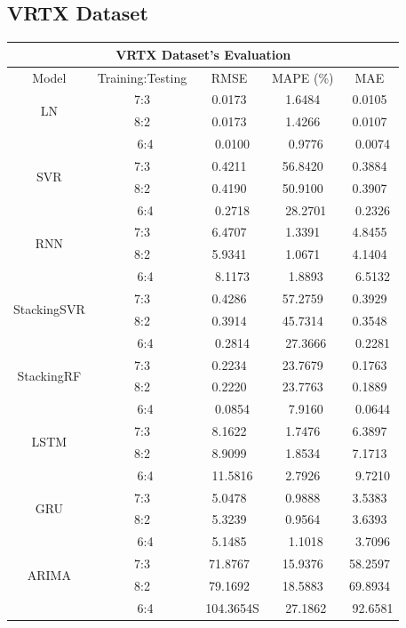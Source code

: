 \documentclass{ieeeojies}
\begin{document}
\subsection{VRTX Dataset} 
\begin{table}[H]
    \centering
    \begin{tabular}{|c|c|c|c|c|}
         \hline
         \multicolumn{5}{|c|}{\textbf{VRTX Dataset's Evaluation}}\\
         \hline
         \centering Model & Training:Testing & RMSE & MAPE (\%) & MAE\\
         \hline
         \multirow{2}{*}{LN} & 7:3 & 0.0173 & 1.6484 & 0.0105 \\ & 8:2 & 0.0173 & 1.4266 & 0.0107 \\ & \ 6:4} & \ 0.0100 & \ 0.9776 & \ 0.0074\\
         \hline
         \multirow{2}{*}{SVR} & 7:3 & 0.4211 & 56.8420 & 0.3884 \\ & 8:2 & 0.4190 & 50.9100 & 0.3907 \\ & \ 6:4} & \ 0.2718 & \ 28.2701 & \ 0.2326\\
         \hline
         \multirow{2}{*}{RNN} & 7:3 & 6.4707 & 1.3391 & 4.8455 \\ & 8:2 & 5.9341 & 1.0671 & 4.1404 \\ & \ 6:4} & \ 8.1173 & \ 1.8893 & \ 6.5132\\
         \hline
         \multirow{2}{*}{StackingSVR} & 7:3 & 0.4286 & 57.2759 & 0.3929 \\ & 8:2 & 0.3914 & 45.7314 & 0.3548 \\ & \ 6:4} & \ 0.2814 & \ 27.3666 & \ 0.2281\\
          \hline
        \multirow{2}{*}{StackingRF} & 7:3 & 0.2234 & 23.7679 & 0.1763 \\ & 8:2 & 0.2220 & 23.7763 & 0.1889 \\ & \ 6:4} & \ 0.0854 & \ 7.9160 & \ 0.0644\\
        \hline
         \multirow{2}{*}{LSTM} & 7:3 & 8.1622 & 1.7476 & 6.3897 \\ & 8:2 & 8.9099 & 1.8534 & 7.1713 \\ & \ 6:4} & \ 11.5816  & 2.7926  & \ 9.7210\\
         \hline
         \multirow{2}{*}{GRU} & 7:3 & 5.0478 & 0.9888 & 3.5383 \\ & 8:2 & 5.3239 & 0.9564 & 3.6393 \\ & \ 6:4} & 5.1485 & \ 1.1018 & \ 3.7096\\
         \hline
         \multirow{2}{*}{ARIMA} & 7:3 & 71.8767 & 15.9376  & 58.2597 \\ & 8:2 & 79.1692  & 18.5883 & 69.8934\\ & \ 6:4} & \ 104.3654S & \ 27.1862 & \ 92.6581\\

\end{tabular}
\end{table}
\end{document}
